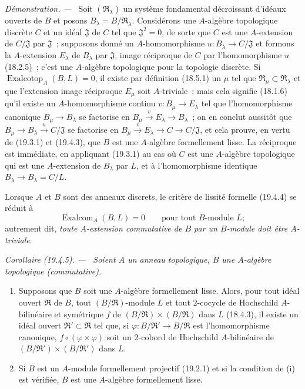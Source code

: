 \documentclass[10pt,oneside]{book}
\makeatletter
\newcommand{\setmanualcurrentlabel}[1]{\def\@currentlabel{#1}}
\newenvironment{corollary}[1][]{%
  \setmanualcurrentlabel{#1}\par\medskip\noindent\itshape Corollaire (#1). ---\ }{\par}
\newenvironment{proof}{%
  \par\medskip\noindent\textit{Démonstration. ---\ }}{\par}
\makeatother
\begin{document}
\begin{proof}
Soit $(\mathfrak R_\lambda)$ un système fondamental décroissant d'idéaux
ouverts de $B$ et posons $B_\lambda=B/\mathfrak R_\lambda$.
Considérons une $A$-algèbre topologique discrète $C$ et un idéal
$\mathfrak J$ de $C$ tel que $\mathfrak J^2=0$, de sorte que $C$ est une
$A$-extension de $C/\mathfrak J$ par $\mathfrak J$~; supposons donné un
$A$-homomorphisme $u:B_\lambda\to C/\mathfrak J$ et formons la
$A$-extension $E_\lambda$ de $B_\lambda$ par $\mathfrak J$, image
réciproque de $C$ par l'homomorphisme $u$ (18.2.5)~; c'est une $A$-algèbre
topologique pour la topologie discrète. Si
$\operatorname{Exalcotop}_A(B,L)=0$, il existe par définition (18.5.1) un
$\mu$ tel que $\mathfrak R_\mu\subset\mathfrak R_\lambda$ et que
l'extension image réciproque $E_\mu$ soit $A$-triviale~; mais cela signifie
(18.1.6) qu'il existe un $A$-homomorphisme continu
$v:B_\mu\to E_\lambda$ tel que l'homomorphisme canonique
$B_\mu\to B_\lambda$ se factorise en
$B_\mu\xrightarrow{v}E_\lambda\to B_\lambda$~; on en conclut
aussitôt que $B_\mu\to B_\lambda\xrightarrow{u}C/\mathfrak J$ se
factorise en
$B_\mu\xrightarrow{v}E_\lambda\to C\to C/\mathfrak J$, et cela
prouve, en vertu de (19.3.1) et (19.4.3), que $B$ est une $A$-algèbre
formellement lisse. La réciproque est immédiate, en appliquant (19.3.1) au cas
où $C$ est une $A$-algèbre topologique qui est une $A$-extension de
$B_\lambda$ par $L$, et à l'homomorphisme identique
$B_\lambda\to B_\lambda=C/L$.
\end{proof}

Lorsque $A$ et $B$ sont des anneaux discrets, le critère de lissité formelle
(19.4.4) se réduit à
\begin{equation}
\tag{19.4.4.1}
\label{0.19.4.4.1-fr}
\operatorname{Exalcom}_A(B,L)=0\qquad\text{pour tout $B$-module $L$};
\end{equation}
autrement dit, \emph{toute $A$-extension commutative de $B$ par un
$B$-module doit être $A$-triviale}.

\begin{corollary}[19.4.5]
\label{0.19.4.5-fr}
Soient $A$ un anneau topologique, $B$ une $A$-algèbre topologique
(commutative).
\begin{enumerate}
  \item[(i)] Supposons que $B$ soit une $A$-algèbre formellement lisse.
  Alors, pour tout idéal ouvert $\mathfrak R$ de $B$, tout
  $(B/\mathfrak R)$-module $L$ et tout $2$-cocycle de Hochschild
  $A$-bilinéaire et symétrique $f$ de
  $(B/\mathfrak R)\times(B/\mathfrak R)$ dans $L$ (18.4.3), il existe un
  idéal ouvert $\mathfrak R'\subset\mathfrak R$ tel que, si
  $\varphi:B/\mathfrak R'\to B/\mathfrak R$ est l'homomorphisme
  canonique, $f\circ(\varphi\times\varphi)$ soit un $2$-cobord de
  Hochschild $A$-bilinéaire de
  $(B/\mathfrak R')\times(B/\mathfrak R')$ dans $L$.
  \item[(ii)] Si $B$ est un $A$-module formellement projectif (19.2.1) et si
  la condition de (i) est vérifiée, $B$ est une $A$-algèbre formellement
  lisse.
\end{enumerate}
\end{corollary}
\end{document}

